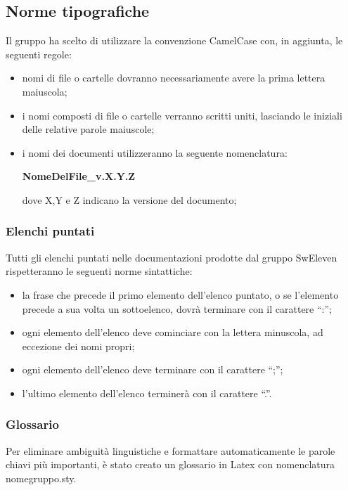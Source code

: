 \subsection{Norme tipografiche}
Il gruppo ha scelto di utilizzare la convenzione CamelCase con, in aggiunta, le seguenti regole:
\begin{itemize}
	\item nomi di file o cartelle dovranno necessariamente avere la prima lettera maiuscola;
	\item i nomi composti di file o cartelle verranno scritti uniti, lasciando le iniziali delle relative parole maiuscole;
	\item i nomi dei documenti utilizzeranno la seguente nomenclatura:
	\begin{center}
	\textbf{NomeDelFile\_v.X.Y.Z}
	\end{center}
	dove X,Y e Z indicano la versione del documento;
\end{itemize}

\subsubsection{Elenchi puntati}
Tutti gli elenchi puntati nelle documentazioni prodotte dal gruppo SwEleven rispetteranno le seguenti norme sintattiche:
\begin{itemize}
	\item la frase che precede il primo elemento dell’elenco puntato, o se l’elemento precede a sua volta un sottoelenco, dovrà terminare con il carattere “:”;
	\item ogni elemento dell’elenco deve cominciare con la lettera minuscola, ad eccezione dei nomi propri;
	\item ogni elemento dell’elenco deve terminare con il carattere “;”;
	\item l’ultimo elemento dell’elenco terminerà con il carattere “.”.
\end{itemize}

\subsubsection{Glossario}
Per eliminare ambiguità linguistiche e formattare automaticamente le parole chiavi più importanti, è stato creato un glossario in Latex con nomenclatura nomegruppo.sty.


